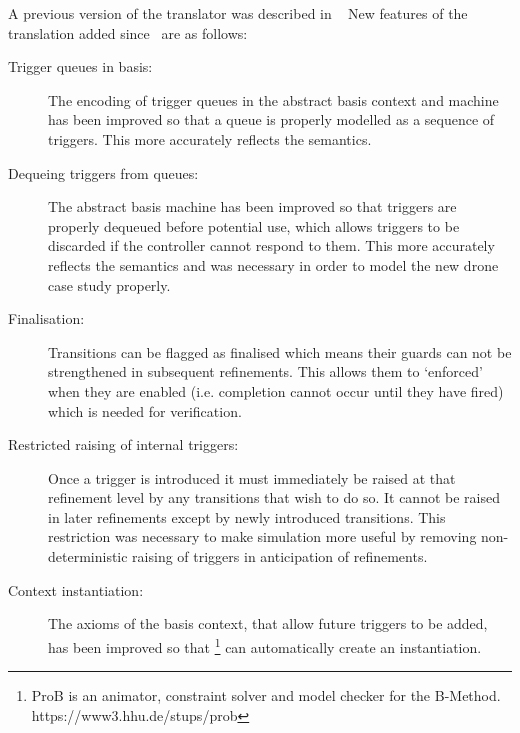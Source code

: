 
 A previous version of the translator was described in ~\cite{MoSnHo18,detect2020} New features of the translation added since~\cite{MoSnHo18,detect2020} are as follows:
 \begin{description}
 \item[Trigger queues in basis:]
 	\begin{sloppypar}
 		The encoding of trigger queues in the abstract basis context and machine has been improved so that a queue is properly modelled as a sequence of triggers.
 		This more accurately reflects the \SCXML semantics.
 	\end{sloppypar}
 \item[Dequeing triggers from queues:]
   \begin{sloppypar}
     The abstract basis machine has been improved so that triggers are properly dequeued before potential use,
     which allows triggers to be discarded if the controller cannot respond to them. 
     This more accurately reflects the \SCXML semantics and was necessary in order to model the new drone case study properly.
   \end{sloppypar}

 \item[Finalisation:] Transitions can be flagged as finalised which means their guards can not be strengthened in subsequent refinements. This allows them to `enforced' when they are enabled (i.e. completion cannot occur until they have fired) which is needed for verification. 

 \item[Restricted raising of internal triggers:] Once a trigger is introduced it must immediately be raised at that refinement level by any transitions that wish to do so. It cannot be raised in later refinements except by newly introduced transitions. This restriction was necessary to make simulation more useful by removing non-deterministic raising of triggers in anticipation of refinements.

 \item[Context instantiation:] The axioms of the basis context, that allow future triggers to be added, has been improved so that \PROB\footnote{ProB is an animator, constraint solver and model checker for the B-Method. https://www3.hhu.de/stups/prob} can automatically create an instantiation. 

 \end{description}

